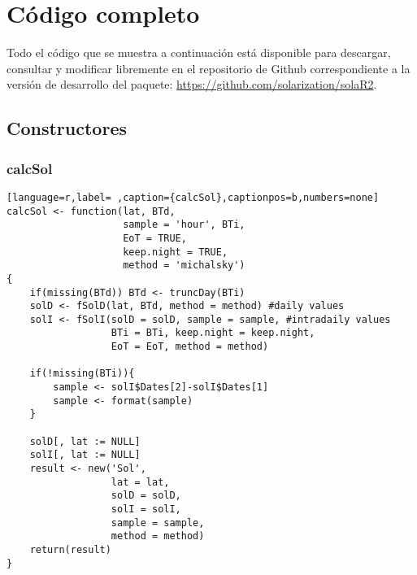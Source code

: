 \chapter{Código completo}
\label{chap:codigo-completo}

Todo el código que se muestra a continuación está disponible para descargar, consultar y modificar libremente en el repositorio de Github correspondiente a la versión de desarrollo del paquete: \url{https://github.com/solarization/solaR2}.

\section{Constructores}
\label{sec:orgb37f319}
\subsection{calcSol}
\label{sec:org5aefe9b}
\label{subsec:calcsol}
\begin{lstlisting}[language=r,label= ,caption={calcSol},captionpos=b,numbers=none]
calcSol <- function(lat, BTd,
                    sample = 'hour', BTi,
                    EoT = TRUE,
                    keep.night = TRUE,
                    method = 'michalsky')
{
    if(missing(BTd)) BTd <- truncDay(BTi)
    solD <- fSolD(lat, BTd, method = method) #daily values
    solI <- fSolI(solD = solD, sample = sample, #intradaily values
                  BTi = BTi, keep.night = keep.night,
                  EoT = EoT, method = method)

    if(!missing(BTi)){
        sample <- solI$Dates[2]-solI$Dates[1]
        sample <- format(sample)
    }

    solD[, lat := NULL]
    solI[, lat := NULL]
    result <- new('Sol',
                  lat = lat,
                  solD = solD,
                  solI = solI,
                  sample = sample,
                  method = method)
    return(result)
}
\end{lstlisting}
